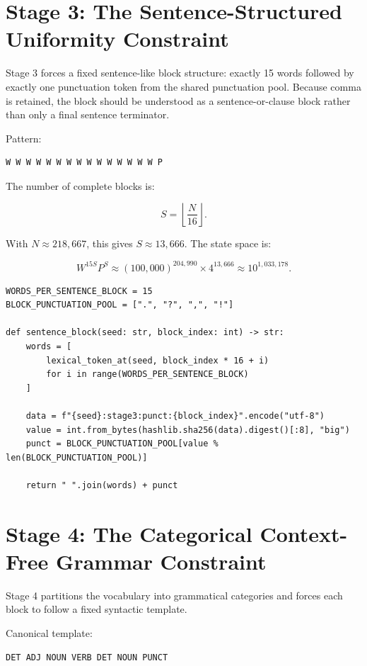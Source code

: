 \documentclass[11pt,a4paper]{article}
\begin{document}
\section{Stage 3: The Sentence-Structured Uniformity Constraint}

Stage 3 forces a fixed sentence-like block structure: exactly 15 words followed by exactly one punctuation token from the shared punctuation pool. Because comma is retained, the block should be understood as a sentence-or-clause block rather than only a final sentence terminator.

Pattern:

\begin{lstlisting}[style=textstyle]
W W W W W W W W W W W W W W W P
\end{lstlisting}

The number of complete blocks is:

\[
S = \left\lfloor \frac{N}{16} \right\rfloor.
\]

With $N \approx 218{,}667$, this gives $S \approx 13{,}666$. The state space is:

\[
W^{15S}P^S
\approx
(100{,}000)^{204{,}990} \times 4^{13{,}666}
\approx
10^{1{,}033{,}178}.
\]

\begin{lstlisting}[style=pythonstyle]
WORDS_PER_SENTENCE_BLOCK = 15
BLOCK_PUNCTUATION_POOL = [".", "?", ",", "!"]

def sentence_block(seed: str, block_index: int) -> str:
    words = [
        lexical_token_at(seed, block_index * 16 + i)
        for i in range(WORDS_PER_SENTENCE_BLOCK)
    ]

    data = f"{seed}:stage3:punct:{block_index}".encode("utf-8")
    value = int.from_bytes(hashlib.sha256(data).digest()[:8], "big")
    punct = BLOCK_PUNCTUATION_POOL[value % len(BLOCK_PUNCTUATION_POOL)]

    return " ".join(words) + punct
\end{lstlisting}

\section{Stage 4: The Categorical Context-Free Grammar Constraint}

Stage 4 partitions the vocabulary into grammatical categories and forces each block to follow a fixed syntactic template.

Canonical template:

\begin{lstlisting}[style=textstyle]
DET ADJ NOUN VERB DET NOUN PUNCT
\end{lstlisting}
\end{document}
